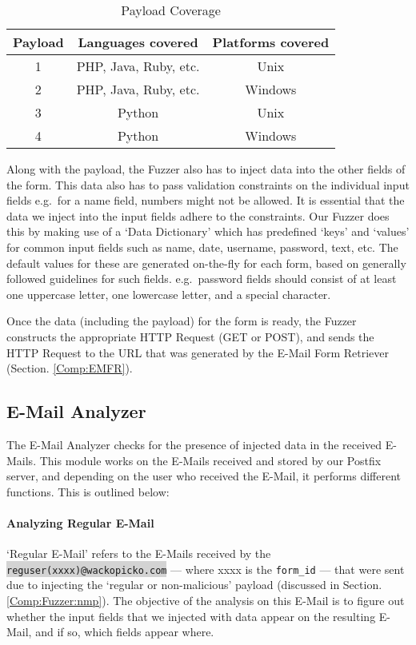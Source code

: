 	\begin{table}[!htbp]
		\centering
		\caption{Payload Coverage}
		\label{tab:payloadcov}
		\begin{tabular}{|c|c|c|}
			\hline
			Payload & Languages covered & Platforms covered\\
			\hline
			1 & PHP, Java, Ruby, etc. & Unix\\
			\hline
			2 & PHP, Java, Ruby, etc. & Windows\\
			\hline
			3 & Python & Unix\\
			\hline
			4 & Python & Windows\\
			\hline
		\end{tabular}
	\end{table}
	Along with the payload, the Fuzzer also has to inject data into the other fields of the form. This data also has to pass validation constraints on the individual input fields e.g.\ for a name field, numbers might not be allowed. It is essential that the data we inject into the input fields adhere to the constraints. Our Fuzzer does this by making use of a `Data Dictionary' which has predefined `keys' and `values' for common input fields such as name, date, username, password, text, etc. The default values for these are generated on-the-fly for each form, based on generally followed guidelines for such fields. e.g.\ password fields should consist of at least one uppercase letter, one lowercase letter, and a special character.
	
	Once the data (including the payload) for the form is ready, the Fuzzer constructs the appropriate HTTP Request (GET or POST), and sends the HTTP Request to the URL that was generated by the E-Mail Form Retriever (Section. \ref{Comp:EMFR}). 
	
		
\subsection{E-Mail Analyzer}
	\label{Comp:EMA}
	The E-Mail Analyzer checks for the presence of injected data in the received E-Mails. This module works on the E-Mails received and stored by our Postfix server, and depending on the user who received the E-Mail, it performs different functions. This is outlined below:
	\paragraph{Analyzing Regular E-Mail}
	`Regular E-Mail' refers to the E-Mails received by the \colorbox{lightgray}{\lstinline{reguser(xxxx)@wackopicko.com}} --- where xxxx is the \lstinline{form_id} --- that were sent due to injecting the `regular or non-malicious' payload (discussed in Section. \ref{Comp:Fuzzer:nmp}). The objective of the analysis on this E-Mail is to figure out whether the input fields that we injected with data appear on the resulting E-Mail, and if so, which fields appear where.
	
